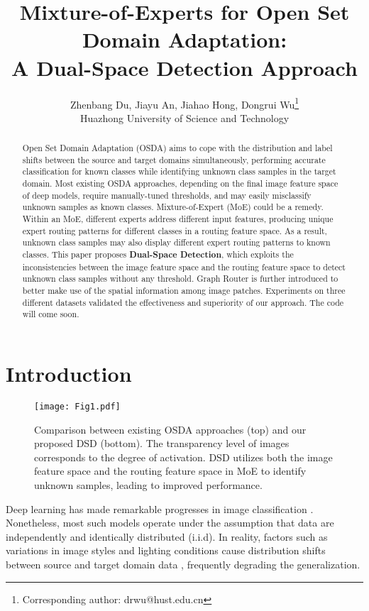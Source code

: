 \documentclass[10pt,twocolumn,letterpaper]{article}
\title{Mixture-of-Experts for Open Set Domain Adaptation:\\ A Dual-Space Detection Approach}
\author{Zhenbang Du, Jiayu An, Jiahao Hong, Dongrui Wu\thanks{Corresponding author: drwu@hust.edu.cn}\\
{\small Huazhong University of Science and Technology}
}
\begin{document}
\maketitle

\begin{abstract}
Open Set Domain Adaptation (OSDA) aims to cope with the distribution and label shifts between the source and target domains simultaneously, performing accurate classification for known classes while identifying unknown class samples in the target domain. Most existing OSDA approaches, depending on the final image feature space of deep models, require manually-tuned thresholds, and may easily misclassify unknown samples as known classes. Mixture-of-Expert (MoE) could be a remedy. Within an MoE, different experts address different input features, producing unique expert routing patterns for different classes in a routing feature space. As a result, unknown class samples may also display different expert routing patterns to known classes. This paper proposes \textbf{Dual-Space Detection}, which exploits the inconsistencies between the image feature space and the routing feature space to detect unknown class samples without any threshold. Graph Router is further introduced to better make use of the spatial information among image patches. Experiments on three different datasets validated the effectiveness and superiority of our approach. The code will come soon. 
\end{abstract}

\section{Introduction} \label{sec:intro}

\begin{figure}[htbp]    \centering
    \texttt{[image: Fig1.pdf]}
    \caption{Comparison between existing OSDA approaches (top) and our proposed DSD (bottom). The transparency level of images corresponds to the degree of activation. DSD utilizes both the image feature space and the routing feature space in MoE to identify unknown samples, leading to improved performance.} \label{Fig1}
    \vspace{-0.15in}
\end{figure}

Deep learning has made remarkable progresses in image classification \cite{he2016deep,dosovitskiy2021an}. Nonetheless, most such models operate under the assumption that data are independently and identically distributed (i.i.d). In reality, factors such as variations in image styles and lighting conditions cause distribution shifts between source and target domain data \cite{zhao2020review}, frequently degrading the generalization.
\end{document}
